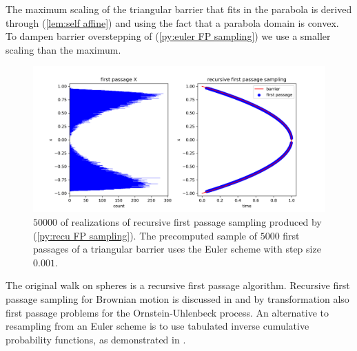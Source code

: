 \documentclass[a4paper,12pt]{article}
\begin{document}
\begin{pythonn} \label{py:euler FP sampling}
\end{pythonn}

\begin{pythonn} \label{py:recu FP sampling}
    The maximum scaling of the triangular barrier that fits
    in the parabola is derived through (\ref{lem:self affine})
    and using the fact that a parabola domain is convex. To dampen barrier
    overstepping of (\ref{py:euler FP sampling}) we use a smaller scaling
    than the maximum. \\

    \begin{figure}[h!]
        \centering
        \includegraphics[width=1\textwidth]{plots/recursive first passage para.png}
        \caption{ $50000$ of realizations of recursive first passage sampling produced
            by (\ref{py:recu FP sampling}). The precomputed sample of $5000$ first
            passages of a triangular barrier uses the Euler scheme with
            step size $0.001$.}
        \label{fig:recursive first passage para}
    \end{figure}
\end{pythonn}

\begin{related}
    The original walk on spheres is a recursive first passage algorithm.
    Recursive first passage sampling for
    Brownian motion is discussed in \cite{herrmann_first-passage_2016}
    and by transformation also first passage problems for the
    Ornstein-Uhlenbeck process.
    An alternative to resampling from an Euler scheme is to use tabulated
    inverse cumulative probability functions,
    as demonstrated in \cite{hwang_simulationtabulation_2001}.
\end{related}
\end{document}
